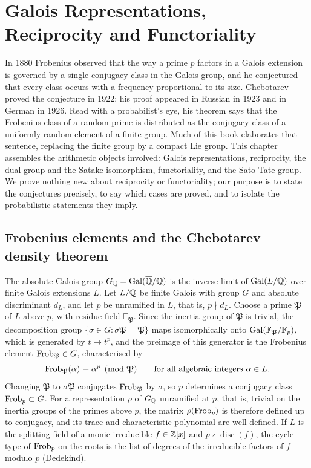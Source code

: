 \chapter{Galois Representations, Reciprocity and Functoriality}\label{ch:03}

In 1880 Frobenius observed that the way a prime $p$ factors in a Galois extension is governed by a single conjugacy class in the Galois group, and he conjectured that every class occurs with a frequency proportional to its size. Chebotarev proved the conjecture in 1922; his proof appeared in Russian in 1923 and in German in 1926. Read with a probabilist's eye, his theorem says that the Frobenius class of a random prime is distributed as the conjugacy class of a uniformly random element of a finite group. Much of this book elaborates that sentence, replacing the finite group by a compact Lie group. This chapter assembles the arithmetic objects involved: Galois representations, reciprocity, the dual group and the Satake isomorphism, functoriality, and the Sato Tate group. We prove nothing new about reciprocity or functoriality; our purpose is to state the conjectures precisely, to say which cases are proved, and to isolate the probabilistic statements they imply.

\section{Frobenius elements and the Chebotarev density theorem}\label{sec:ch3cheb}

The absolute Galois group $G_{\mathbb{Q}}=\operatorname{Gal}(\overline{\mathbb{Q}}/\mathbb{Q})$ is the inverse limit of $\operatorname{Gal}(L/\mathbb{Q})$ over finite Galois extensions $L$. Let $L/\mathbb{Q}$ be finite Galois with group $G$ and absolute discriminant $d_L$, and let $p$ be unramified in $L$, that is, $p\nmid d_L$. Choose a prime $\mathfrak{P}$ of $L$ above $p$, with residue field $\mathbb{F}_{\mathfrak{P}}$. Since the inertia group of $\mathfrak{P}$ is trivial, the decomposition group $\{\sigma\in G:\sigma\mathfrak{P}=\mathfrak{P}\}$ maps isomorphically onto $\operatorname{Gal}(\mathbb{F}_{\mathfrak{P}}/\mathbb{F}_p)$, which is generated by $t\mapsto t^p$, and the preimage of this generator is the Frobenius element $\operatorname{Frob}_{\mathfrak{P}}\in G$, characterised by
\[
\operatorname{Frob}_{\mathfrak{P}}(\alpha)\equiv\alpha^p \pmod{\mathfrak{P}}\qquad\text{for all algebraic integers }\alpha\in L .
\]
Changing $\mathfrak{P}$ to $\sigma\mathfrak{P}$ conjugates $\operatorname{Frob}_{\mathfrak{P}}$ by $\sigma$, so $p$ determines a conjugacy class $\operatorname{Frob}_p\subset G$. For a representation $\rho$ of $G_{\mathbb{Q}}$ unramified at $p$, that is, trivial on the inertia groups of the primes above $p$, the matrix $\rho(\operatorname{Frob}_p)$ is therefore defined up to conjugacy, and its trace and characteristic polynomial are well defined. If $L$ is the splitting field of a monic irreducible $f\in\mathbb{Z}[x]$ and $p\nmid\operatorname{disc}(f)$, the cycle type of $\operatorname{Frob}_p$ on the roots is the list of degrees of the irreducible factors of $f$ modulo $p$ (Dedekind).

